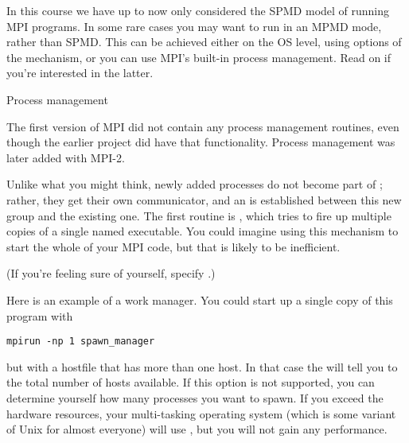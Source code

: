 
In this course we have up to now only considered the \ac{SPMD} model
of running MPI programs.  In some rare cases you may want to run in an
\ac{MPMD} mode, rather than \ac{SPMD}. This can be achieved either on
the \ac{OS} level, using options of the  mechanism,
or you can use MPI's built-in process management. Read on if you're
interested in the latter.

 {Process management}
\label{sec:mpi-dynamic}

The first version of MPI did not contain any process management
routines, even though the earlier  project did have
that functionality. Process management was later added with MPI-2.

Unlike what you might think, newly added processes do not become part
of ; rather, they get their own communicator, and an
 is established between this new group
and the existing one. The first routine is
, which tries to fire up multiple copies
of a single named executable. You could imagine using this mechanism
to start the whole of your MPI code, but that is likely to be inefficient.


(If you're feeling sure of yourself, specify .)

Here is an example of a work manager.
%
%
%
You could start up a single copy of this program with 
\begin{verbatim}
mpirun -np 1 spawn_manager
\end{verbatim}
but with a hostfile that has more than one host. In that case the
 will tell you to the total number of
hosts available. If this option is not supported, you can determine
yourself how many processes you want to spawn. If you exceed the
hardware resources, your multi-tasking operating system (which is some
variant of Unix for almost everyone) will use
, but you will not gain any performance.

